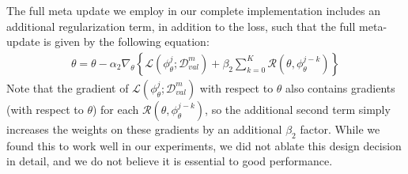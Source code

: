 The full meta update we employ in our complete implementation includes an additional regularization term, in addition to the loss, such that the full meta-update is given by the following equation:
\begin{align*}
    \theta = \theta - \alpha_2 \nabla_{\theta} \left\{ \mathcal{L}(\phi^j_{\theta}; \mathcal{D}_{val}^m) + \beta_2 \sum_{k=0}^K\mathcal{R}(\theta, \phi^{j-k}_{\theta}) \right\} 
\end{align*}
Note that the gradient of $\mathcal{L}(\phi^j_{\theta}; \mathcal{D}_{val}^m)$ with respect to $\theta$ also contains gradients (with respect to $\theta$) for each $\mathcal{R}(\theta, \phi^{j-k}_{\theta})$, so the additional second term simply increases the weights on these gradients by an additional $\beta_2$ factor. While we found this to work well in our experiments, we did not ablate this design decision in detail, and we do not believe it is essential to good performance.
